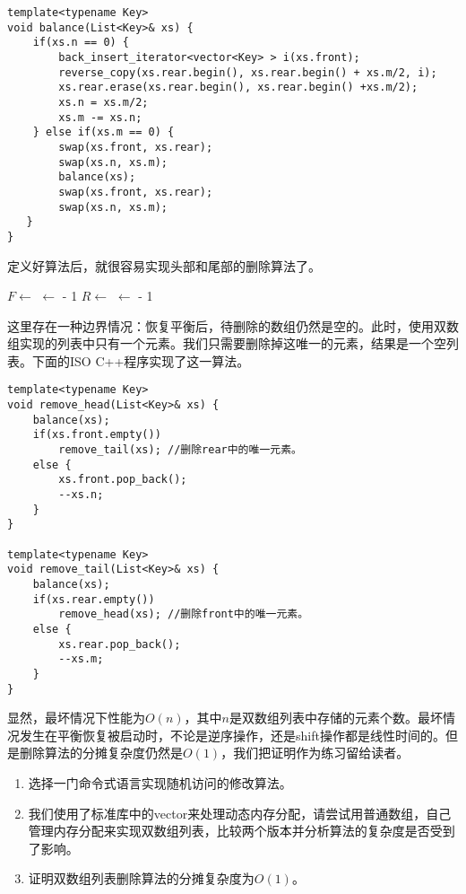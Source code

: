 \documentclass[UTF8]{article}
\begin{document}
\begin{lstlisting}
template<typename Key>
void balance(List<Key>& xs) {
    if(xs.n == 0) {
        back_insert_iterator<vector<Key> > i(xs.front);
        reverse_copy(xs.rear.begin(), xs.rear.begin() + xs.m/2, i);
        xs.rear.erase(xs.rear.begin(), xs.rear.begin() +xs.m/2);
        xs.n = xs.m/2;
        xs.m -= xs.n;
    } else if(xs.m == 0) {
        swap(xs.front, xs.rear);
        swap(xs.n, xs.m);
        balance(xs);
        swap(xs.front, xs.rear);
        swap(xs.n, xs.m);
   }
}
\end{lstlisting}

定义好算法后，就很容易实现头部和尾部的删除算法了。

\begin{algorithmic}
  \State {}
  \State $F \gets $ 
    \State {}
  \Else
    \State {} $\gets $  - 1
  \EndIf
\EndFunction
\Statex
{}
  \State {}
  \State $R \gets $ 
    \State {}
  \Else
    \State {} $\gets $  - 1
  \EndIf
\EndFunction
\end{algorithmic}

这里存在一种边界情况：恢复平衡后，待删除的数组仍然是空的。此时，使用双数组实现的列表中只有一个元素。我们只需要删除掉这唯一的元素，结果是一个空列表。下面的ISO C++程序实现了这一算法。

\begin{lstlisting}
template<typename Key>
void remove_head(List<Key>& xs) {
    balance(xs);
    if(xs.front.empty())
        remove_tail(xs); //删除rear中的唯一元素。
    else {
        xs.front.pop_back();
        --xs.n;
    }
}

template<typename Key>
void remove_tail(List<Key>& xs) {
    balance(xs);
    if(xs.rear.empty())
        remove_head(xs); //删除front中的唯一元素。
    else {
        xs.rear.pop_back();
        --xs.m;
    }
}
\end{lstlisting}

显然，最坏情况下性能为$O(n)$，其中$n$是双数组列表中存储的元素个数。最坏情况发生在平衡恢复被启动时，不论是逆序操作，还是shift操作都是线性时间的。但是删除算法的分摊复杂度仍然是$O(1)$，我们把证明作为练习留给读者。

\begin{Exercise}
\begin{enumerate}
\item 选择一门命令式语言实现随机访问的修改算法。
\item 我们使用了标准库中的vector来处理动态内存分配，请尝试用普通数组，自己管理内存分配来实现双数组列表，比较两个版本并分析算法的复杂度是否受到了影响。
\item 证明双数组列表删除算法的分摊复杂度为$O(1)$。
\end{enumerate}
\end{Exercise}
\end{document}
